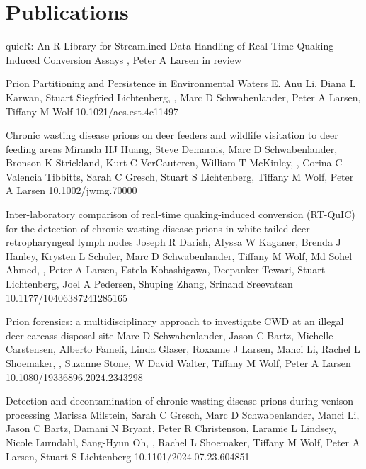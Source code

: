 \documentclass{resume}
\begin{document}
    \section{Publications}
        \begin{samepage}
            {quicR: An R Library for Streamlined Data Handling of Real-Time Quaking Induced Conversion Assays}
            {\me{}, Peter A Larsen}
            {in review}

            {Prion Partitioning and Persistence in Environmental Waters}
            {E. Anu Li, Diana L Karwan, Stuart Siegfried Lichtenberg, \me{}, Marc D Schwabenlander, Peter A Larsen, Tiffany M Wolf}
            {10.1021/acs.est.4c11497}

            {Chronic wasting disease prions on deer feeders and wildlife visitation to deer feeding areas}
            {Miranda HJ Huang, Steve Demarais, Marc D Schwabenlander, Bronson K Strickland, Kurt C VerCauteren, William T McKinley, \me{}, Corina C Valencia Tibbitts, Sarah C Gresch, Stuart S Lichtenberg, Tiffany M Wolf, Peter A Larsen}
            {10.1002/jwmg.70000}

            {Inter-laboratory comparison of real-time quaking-induced conversion (RT-QuIC) for the detection of chronic wasting disease prions in white-tailed deer retropharyngeal lymph nodes}
            {Joseph R Darish, Alyssa W Kaganer, Brenda J Hanley, Krysten L Schuler, Marc D Schwabenlander, Tiffany M Wolf, Md Sohel Ahmed, \me{}, Peter A Larsen, Estela Kobashigawa, Deepanker Tewari, Stuart Lichtenberg, Joel A Pedersen, Shuping Zhang, Srinand Sreevatsan}
            {10.1177/10406387241285165}

            {Prion forensics: a multidisciplinary approach to investigate CWD at an illegal deer carcass disposal site}
            {Marc D Schwabenlander, Jason C Bartz, Michelle Carstensen, Alberto Fameli, Linda Glaser, Roxanne J Larsen, Manci Li, Rachel L Shoemaker, \me{}, Suzanne Stone, W David Walter, Tiffany M Wolf, Peter A Larsen}
            {10.1080/19336896.2024.2343298}

            {Detection and decontamination of chronic wasting disease prions during venison processing}
            {Marissa Milstein, Sarah C Gresch, Marc D Schwabenlander, Manci Li, Jason C Bartz, Damani N Bryant, Peter R Christenson, Laramie L Lindsey, Nicole Lurndahl, Sang-Hyun Oh, \me{}, Rachel L Shoemaker, Tiffany M Wolf, Peter A Larsen, Stuart S Lichtenberg}
            {10.1101/2024.07.23.604851}


\end{samepage}
\end{document}
